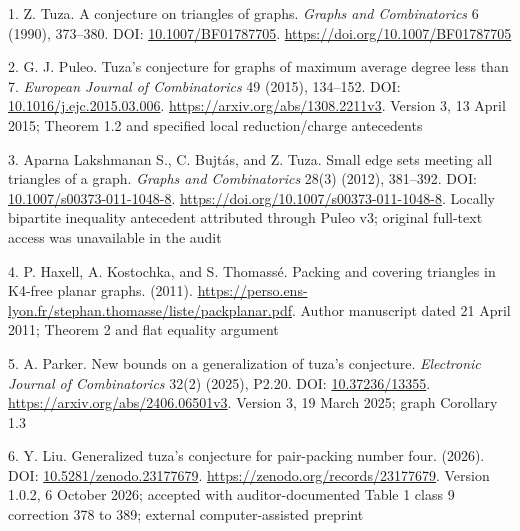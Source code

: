 \documentclass[11pt,a4paper]{article}
\newenvironment{CSLReferences}[2]{\par\setlength{\parindent}{0pt}\setlength{\parskip}{6pt}}{}
\begin{document}
\protect{}\label{refs}
\begin{CSLReferences}{0}{1}
\par{}\label{ref-Tuza1990}
1. Z. Tuza. A conjecture on triangles of graphs. \emph{Graphs and Combinatorics} 6 (1990), 373--380. DOI: \href{https://doi.org/10.1007/BF01787705}{10.1007/BF01787705}. \url{https://doi.org/10.1007/BF01787705}

\par{}\label{ref-Puleo2015}
2. G. J. Puleo. Tuza's conjecture for graphs of maximum average degree less than 7. \emph{European Journal of Combinatorics} 49 (2015), 134--152. DOI: \href{https://doi.org/10.1016/j.ejc.2015.03.006}{10.1016/j.ejc.2015.03.006}. \url{https://arxiv.org/abs/1308.2211v3}. Version 3, 13 April 2015; Theorem 1.2 and specified local reduction/charge antecedents

\par{}\label{ref-Lakshmanan2012}
3. Aparna Lakshmanan S., C. Bujtás, and Z. Tuza. Small edge sets meeting all triangles of a graph. \emph{Graphs and Combinatorics} 28(3) (2012), 381--392. DOI: \href{https://doi.org/10.1007/s00373-011-1048-8}{10.1007/s00373-011-1048-8}. \url{https://doi.org/10.1007/s00373-011-1048-8}. Locally bipartite inequality antecedent attributed through Puleo v3; original full-text access was unavailable in the audit

\par{}\label{ref-HKTFlat2011}
4. P. Haxell, A. Kostochka, and S. Thomassé. Packing and covering triangles in {K4}-free planar graphs. (2011). \url{https://perso.ens-lyon.fr/stephan.thomasse/liste/packplanar.pdf}. Author manuscript dated 21 April 2011; Theorem 2 and flat equality argument

\par{}\label{ref-Parker2025}
5. A. Parker. New bounds on a generalization of tuza's conjecture. \emph{Electronic Journal of Combinatorics} 32(2) (2025), P2.20. DOI: \href{https://doi.org/10.37236/13355}{10.37236/13355}. \url{https://arxiv.org/abs/2406.06501v3}. Version 3, 19 March 2025; graph Corollary 1.3

\par{}\label{ref-Liu2026}
6. Y. Liu. Generalized tuza's conjecture for pair-packing number four. (2026). DOI: \href{https://doi.org/10.5281/zenodo.23177679}{10.5281/zenodo.23177679}. \url{https://zenodo.org/records/23177679}. Version 1.0.2, 6 October 2026; accepted with auditor-documented Table 1 class 9 correction 378 to 389; external computer-assisted preprint


\end{CSLReferences}
\end{document}
